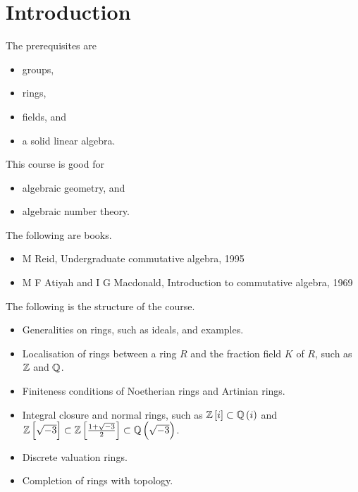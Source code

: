 \def\module{M4P55 Commutative Algebra}
\def\lecturer{Prof Alexei Skorobogatov}
\def\term{Autumn 2019}
\def\cover{}
\def\syllabus{}
\def\thm{section}







\section{Introduction}


The prerequisites are
\begin{itemize}
\item groups,
\item rings,
\item fields, and
\item a solid linear algebra.
\end{itemize}

This course is good for
\begin{itemize}
\item algebraic geometry, and
\item algebraic number theory.
\end{itemize}

The following are books.
\begin{itemize}
\item M Reid, Undergraduate commutative algebra, 1995
\item M F Atiyah and I G Macdonald, Introduction to commutative algebra, 1969
\end{itemize}

The following is the structure of the course.
\begin{itemize}
\item Generalities on rings, such as ideals, and examples.
\item Localisation of rings between a ring $ R $ and the fraction field $ K $ of $ R $, such as $ \mathbb{Z} $ and $ \mathbb{Q} $.
\item Finiteness conditions of Noetherian rings and Artinian rings.
\item Integral closure and normal rings, such as $ \ZZ\sbr{i} \subset \QQ\br{i} $ and $ \ZZ\sbr{\sqrt{-3}} \subset \ZZ\sbr{\tfrac{1 + \sqrt{-3}}{2}} \subset \QQ\br{\sqrt{-3}} $.
\item Discrete valuation rings.
\item Completion of rings with topology.
\end{itemize}

